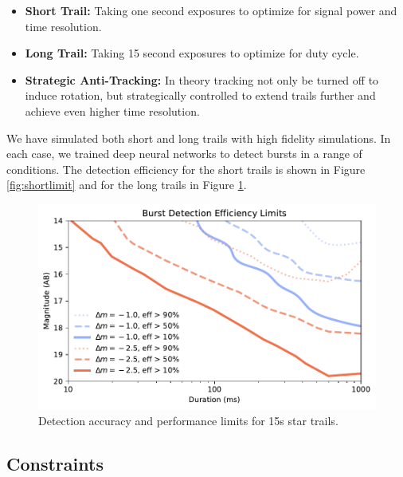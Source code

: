 \documentclass[12pt, letterpaper]{article}
\begin{document}
\begin{itemize}
\item \textbf{Short Trail:} Taking one second exposures to optimize for signal power and time resolution.

\item \textbf{Long Trail:} Taking 15 second exposures to optimize for duty cycle.

\item \textbf{Strategic Anti-Tracking:} In theory tracking not only be turned off to induce rotation, but strategically controlled to extend trails further and achieve even higher time resolution. 
\end{itemize}

We have simulated both short and long trails with high fidelity simulations. In each case, we trained deep neural networks to detect bursts in a range of conditions. The detection efficiency for the short trails is shown in Figure \ref{fig:shortlimit} and for the long trails in Figure \ref{fig:longlimit}. 

\begin{figure}[htb!]
\center
\includegraphics{f7.pdf}
\caption{Detection accuracy and performance limits for 15s star trails.}
\label{fig:longlimit}
\end{figure}

\subsection{Constraints}
\end{document}

